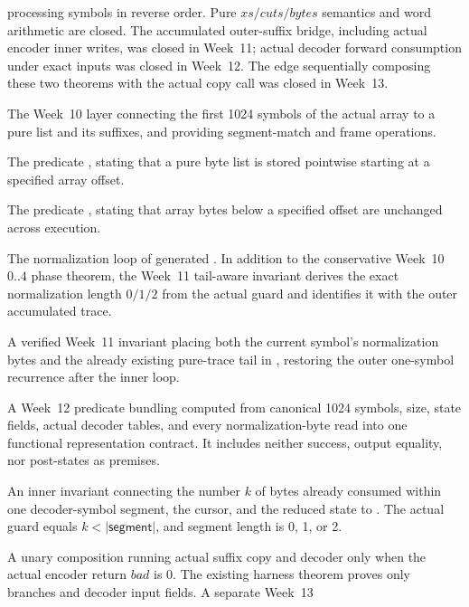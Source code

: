 \begin{description}[style=nextline,leftmargin=3.1cm]
  processing symbols in reverse order. Pure \(xs/cuts/bytes\) semantics and word
  arithmetic are closed. The accumulated outer-suffix bridge, including actual
  encoder inner writes, was closed in Week~11; actual decoder forward consumption
  under exact inputs was closed in Week~12. The edge sequentially composing these
  two theorems with the actual copy call was closed in Week~13.
  \item[Array/list bridge] The Week~10 layer connecting the first 1024 symbols
  of the actual array to a pure list and its suffixes, and providing segment-match
  and frame operations.
  \item[Segment match] The predicate , stating that
  a pure byte list is stored pointwise starting at a specified array offset.
  \item[Prefix frame] The predicate , stating that array
  bytes below a specified offset are unchanged across execution.
  \item[Actual inner loop] The normalization loop of generated
  . In addition to the conservative Week~10 \(0..4\)
  phase theorem, the Week~11 tail-aware invariant derives the exact normalization
  length \(0/1/2\) from the actual guard and identifies it with the outer accumulated trace.
  \item[Tail-aware invariant] A verified Week~11 invariant placing both the
  current symbol's normalization bytes and the already existing pure-trace tail
  in , restoring the outer one-symbol recurrence
  after the inner loop.
  \item[Exact-trace decoder input] A Week~12 predicate bundling
   computed from canonical 1024 symbols, size, state fields,
  actual decoder tables, and every normalization-byte read into one functional
  representation contract. It includes neither success, output equality, nor
  post-states as premises.
  \item[Partial replay invariant] An inner invariant connecting the number
  \(k\) of bytes already consumed within one decoder-symbol segment, the cursor,
  and the reduced state to . The actual guard
  equals \(k<|\mathsf{segment}|\), and segment length is 0, 1, or 2.
  \item[Actual rANS harness] A unary composition running actual suffix copy and
  decoder only when the actual encoder return \(bad\) is 0. The existing harness
  theorem proves only branches and decoder input fields. A separate Week~13

\end{description}
